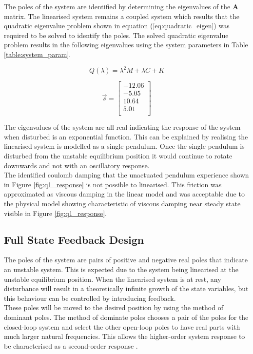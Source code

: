 The poles of the system are identified by determining the eigenvalues of the $\boldsymbol{A}$ matrix. The linearised system remains a coupled system which results that the quadratic eigenvalue problem shown in equation (\ref{eq:quadratic_eigen}) was required to be solved to identify the poles. The solved quadratic eigenvalue problem results in the following eigenvalues using the system parameters in Table \ref{table:system_param}.

\begin{equation} \label{eq:quadratic_eigen}
Q(\lambda) =\lambda^{2}M + \lambda C + K
\end{equation}

$$
\vec{s} = 
\begin{bmatrix}
-12.06 \\
-5.05 \\
10.64 \\
5.01 \\
\end{bmatrix}
$$

The eigenvalues of the system are all real indicating the response of the system when disturbed is an exponential function. This can be explained by realising the linearised system is modelled as a single pendulum. Once the single pendulum is disturbed from the unstable equilibrium position it would continue to rotate downwards and not with an oscillatory response.\\

The identified coulomb damping that the unactuated pendulum experience shown in Figure \ref{fig:q1_response} is not possible to linearised. This friction was approximated as viscous damping in the linear model and was acceptable due to the physical model showing characteristic of viscous damping near steady state visible in Figure \ref{fig:q1_response}.


\subsection{Full State Feedback Design}
The poles of the system are pairs of positive and negative real poles that indicate an unstable system. This is expected due to the system being linearised at the unstable equilibrium position. When the linearised system is at rest, any disturbance will result in a theoretically infinite growth of the state variables, but this behaviour can be controlled by introducing feedback. \\

These poles will be moved to the desired position by using the method of dominant poles. The method of dominate poles chooses a pair of the poles for the closed-loop system and select the other open-loop poles to have real parts with much larger natural frequencies. This allows the higher-order system response to be characterised as a second-order response \citep{textbook}. \\

